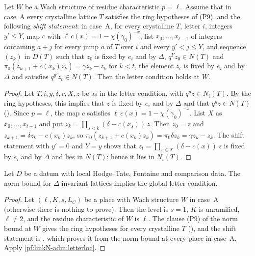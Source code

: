 \begin{lemma}\label{pf:linkN-adm:letterloc}
Let $W$ be a Wach structure of residue characteristic $p=\ell$. Assume that in case~A every crystalline lattice $T$
satisfies the ring hypotheses of (P9), and the following \emph{shift statement}: in case~A, for every crystalline $T$, letter
$i$, integers $y'\le Y$, map $c$ with $\ell\,c(x)=1-\chi(\gamma_0)^{-x}$, list $x_0,\dots,x_{t-1}$ of integers containing
$a+j$ for every jump $a$ of $T$ over $i$ and every $y'<j\le Y$, and sequence $(z_k)$ in $D(T)$ such that $z_0$ is fixed by
$e_i$ and by $\Delta$, $q^Yz_0\in N(T)$ and $\pi_0(z_{k+1}+c(x_k)z_k)=\gamma z_k-z_k$ for $k<t$, the element $z_t$ is fixed by
$e_i$ and by $\Delta$ and satisfies $q^{y'}z_t\in N(T)$. Then the letter condition holds at $W$.
\end{lemma}

\begin{proof}
Let $T,i,y,\delta,c,X,z$ be as in the letter condition, with $q^yz\in N_i(T)$. By the ring hypotheses, this implies that $z$
is fixed by $e_i$ and by $\Delta$ and that $q^yz\in N(T)$
(). Since $p=\ell$, the map $c$ satisfies $\ell\,c(x)=1-\chi(\gamma_0)^{-x}$.
List $X$ as $x_0,\dots,x_{t-1}$ and put $z_k=\prod_{s<k}(\delta-c(x_s))\,z$. Then $z_0=z$ and $z_{k+1}=\delta z_k-c(x_k)z_k$,
so $\pi_0(z_{k+1}+c(x_k)z_k)=\pi_0\delta z_k=\gamma z_k-z_k$. The shift statement with $y'=0$ and $Y=y$ shows that
$z_t=\prod_{x\in X}(\delta-c(x))\,z$ is fixed by $e_i$ and by $\Delta$ and lies in $N(T)$; hence it lies in $N_i(T)$.
\end{proof}

\begin{proposition}\label{pf:linkN-adm:letter}
Let $D$ be a datum with local Hodge--Tate, Fontaine and comparison data. The norm bound for $\Delta$-invariant lattices
implies the global letter condition.
\end{proposition}

\begin{proof}
Let $(\ell,K,s,L_C)$ be a place with Wach structure $W$ in case~A (otherwise there is nothing to prove). Then the level is
$s=1$, $K$ is unramified, $\ell\ne2$, and the residue characteristic of $W$ is $\ell$. The clause (P9) of the norm bound at
$W$ gives the ring hypotheses for every crystalline $T$
(), and the shift statement is
, which proves it from the norm bound at every place in
case~A. Apply \cref{pf:linkN-adm:letterloc}.
\end{proof}

